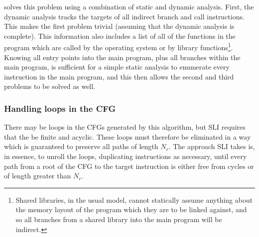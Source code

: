 {\Implementation} solves this problem using a combination of static
and dynamic analysis.  First, the dynamic analysis tracks the targets
of all indirect branch and call instructions.  This makes the first
problem trivial (assuming that the dynamic analysis is complete).
This information also includes a list of all of the functions in the
program which are called by the operating system or by library
functions\footnote{Shared libraries, in the usual model, cannot
  statically assume anything about the memory layout of the program
  which they are to be linked against, and so all branches from a
  shared library into the main program will be indirect.}.  Knowing
all entry points into the main program, plus all branches within the
main program, is sufficient for a simple static analysis to enumerate
every instruction in the main program, and this then allows the second
and third problems to be solved as well.

\subsubsection{Handling loops in the CFG}

There may be loops in the CFGs generated by this algorithm, but SLI
requires that the \StateMachines be finite and acyclic.  These loops
must therefore be eliminated in a way which is guaranteed to preserve
all paths of length $N_r$.  The approach SLI takes is, in essence, to
unroll the loops, duplicating instructions as necessary, until every
path from a root of the CFG to the target instruction is either free
from cycles or of length greater than $N_r$.

